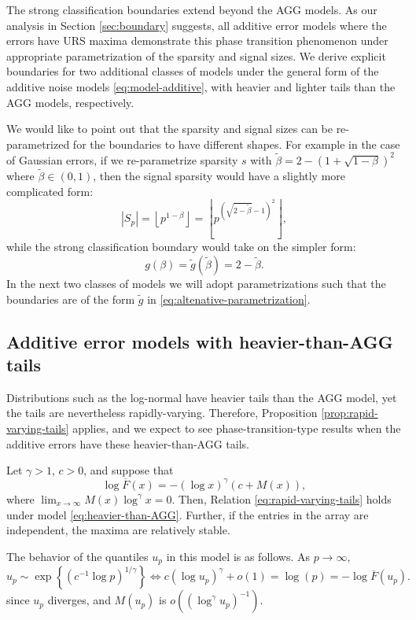 The strong classification boundaries extend beyond the AGG models.
As our analysis in Section \ref{sec:boundary} suggests, all additive error models where the errors have URS maxima demonstrate this phase transition phenomenon under appropriate parametrization of the sparsity and signal sizes.
We derive explicit boundaries for two additional classes of models under the general form of the additive noise models \eqref{eq:model-additive}, with heavier and lighter tails than the AGG models, respectively. 

We would like to point out that the sparsity and signal sizes can be re-parametrized for the boundaries to have different shapes.
For example in the case of Gaussian errors, if we re-parametrize sparsity $s$ with 
$\widetilde{\beta} = 2 - \left(1 + \sqrt{1-\beta}\right)^2$ where $\widetilde{\beta}\in(0,1)$, then the signal sparsity would have a slightly more complicated form:
$$
\left|S_p\right| = \left\lfloor p^{1-\beta} \right\rfloor = \left\lfloor p^{\left(\sqrt{2 - \widetilde{\beta}} - 1\right)^2}\right\rfloor,
$$
while the strong classification boundary would take on the simpler form:
\begin{equation}\label{eq:altenative-parametrization}
g(\beta) = \widetilde{g}(\widetilde{\beta}) = 2 - \widetilde{\beta}.
\end{equation}
In the next two classes of models we will adopt parametrizations such that the boundaries are of the form $\widetilde{g}$ in \eqref{eq:altenative-parametrization}.

\subsection{Additive error models with heavier-than-AGG tails}

Distributions such as the log-normal have heavier tails than the AGG model, yet the tails are nevertheless rapidly-varying. 
Therefore, Proposition \ref{prop:rapid-varying-tails} applies, and we expect to see phase-transition-type results when the additive errors have these heavier-than-AGG tails.

\begin{example} \label{exmp:heavier-than-AGG}
Let $\gamma>1$, $c>0$, and suppose that
\begin{equation} \label{eq:heavier-than-AGG}
    \log{\overline{F}(x)} = - \left(\log x\right)^\gamma \left(c+M(x)\right),
\end{equation}
where $\lim_{x\to\infty} M(x)\log^\gamma{x}= 0$. Then, Relation \eqref{eq:rapid-varying-tails} holds under 
model \eqref{eq:heavier-than-AGG}. Further, if the entries in the array are independent, the 
maxima are relatively stable.

The behavior of the quantiles $u_p$ in this model is as follows. As $p\to\infty,$
\begin{equation*}
    u_p \sim \exp{\left\{\left(c^{-1}\log{p}\right)^{1/\gamma}\right\}}
    \iff c\left(\log{u_p}\right)^{\gamma} + o(1) = \log(p) = - \log \overline{F}(u_p).
\end{equation*}
since $u_p$ diverges, and $M(u_p)$ is $o((\log^\gamma u_p)^{-1})$.
\end{example}


